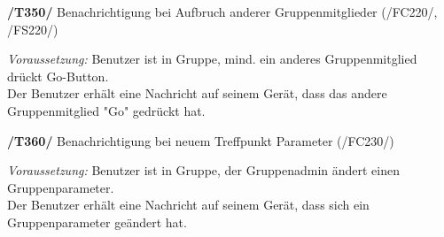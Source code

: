 \textbf{/T350/} Benachrichtigung bei Aufbruch anderer Gruppenmitglieder (/FC220/, /FS220/)\\
\begin{center}
\vspace{-\parskip}
\begin{minipage}[t]{0.9\textwidth}
\emph{Voraussetzung:} Benutzer ist in Gruppe, mind. ein anderes Gruppenmitglied drückt Go-Button.\\
Der Benutzer erhält eine Nachricht auf seinem Gerät, dass das andere Gruppenmitglied "Go" gedrückt hat.\\
\end{minipage}
\end{center}

\textbf{/T360/} Benachrichtigung bei neuem Treffpunkt Parameter (/FC230/)\\
\begin{center}
\vspace{-\parskip}
\begin{minipage}[t]{0.9\textwidth}
\emph{Voraussetzung:} Benutzer ist in Gruppe, der Gruppenadmin ändert einen Gruppenparameter.\\
Der Benutzer erhält eine Nachricht auf seinem Gerät, dass sich ein Gruppenparameter geändert hat.\\
\end{minipage}
\end{center}

